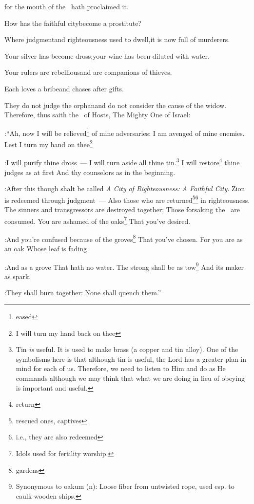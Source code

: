 \begin{inparaenum}
  \pc{}for the mouth of the \lord\ hath proclaimed it.%

  \pa{} How has the faithful city\pa{}become a prostitute?%

  \pb{}Where judgment\pa{}and righteousness used to dwell,\pa{}it is now full of murderers.%

  \pa{} Your silver has become dross;\pa{}your wine has been diluted with water.%

  \pa{} Your rulers are rebellious\pa{}and are companions of thieves.%

  \pa{}Each loves a bribe\pa{}and chases after gifts.%

  \pa{}They do not judge the orphan\pa{}and do not consider the cause of the widow.%
   Therefore, thus saith the \lord\ of Hosts, The Mighty One of Israel:\smallskip%

:``Ah, now I will be relieved\footnote{eased} of mine adversaries: I am avenged of mine enemies.%
   Lest I turn my hand on thee\footnote{I will turn my hand back on thee}%

:I will purify thine dross~--- I will turn aside all thine tin.\footnote{Tin \emph{is} useful. It is used to make brass (a copper and tin alloy). One of the symbolisms here is that although tin is useful, the Lord has a greater plan in mind for each of us. Therefore, we need to listen to Him and do as He commands although we may think that what we are doing in lieu of obeying is important and useful.}%
   I will restore\footnote{return} thine judges as at first And thy counselors as in the beginning.%

:After this though shalt be called \textit{A City of Righteousness: A Faithful City}.%
   Zion is redeemed through judgment~--- Also those who are returned\footnote{rescued ones, captives}\footnote{i.e., they are also redeemed} in righteousness.%
   The sinners and transgressors are destroyed together; Those forsaking the \lord\ are consumed.%
   You are ashamed of the oaks\footnote{Idols used for fertility worship.} That you've desired.%

:And you're confused because of the groves\footnote{gardens} That you've chosen.%
   For you are as an oak Whose leaf is fading%

:And as a grove That hath no water.%
   The strong shall be as tow\footnote{Synonymous to oakum (n): Loose fiber from untwisted rope, used esp. to caulk wooden ships.} And its maker as spark.%

:They shall burn together: None shall quench them.''%
\end{inparaenum}
